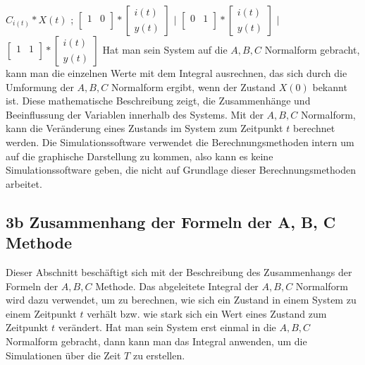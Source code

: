 \documentclass[11pt, a4paper, twoside]{article}   	%
\begin{document}
\newline
\newline
$
C_{i(t)}
*
X(t)
$
;
$
\begin{bmatrix}
	1 & 0\\[0.3em]
\end{bmatrix}
*
\begin{bmatrix}
	i(t)  \\[0.3em]
	y(t)
\end{bmatrix}$
\hspace{1mm}
$|$
\hspace{1mm}
$
\begin{bmatrix}
	0 & 1\\[0.3em]
\end{bmatrix}
*
\begin{bmatrix}
	i(t)  \\[0.3em]
	y(t)
\end{bmatrix} 
$
\hspace{1mm}
$|$
\hspace{1mm}
$
\begin{bmatrix}
	1 & 1\\[0.3em]
\end{bmatrix}
*
\begin{bmatrix}
	i(t)  \\[0.3em]
	y(t)
\end{bmatrix} 
$
\newline
\newline
\newline
Hat man sein System auf die $A, B, C$ Normalform gebracht, kann man die einzelnen Werte mit dem Integral ausrechnen, das sich durch die Umformung der $A, B, C$ Normalform ergibt, wenn der Zustand $X(0)$ bekannt ist.
\newline
\newline
Diese mathematische Beschreibung zeigt, die Zusammenhänge und Beeinflussung der Variablen innerhalb des Systems. Mit der $A, B, C$ Normalform, kann die Veränderung eines Zustands im System zum Zeitpunkt $t$ berechnet werden.
\newline
\newline
Die Simulationssoftware verwendet die Berechnungsmethoden intern um auf die graphische Darstellung zu kommen, also kann es keine Simulationssoftware geben, die nicht auf Grundlage dieser Berechnungsmethoden arbeitet.
\newpage
\subsection{3b Zusammenhang der Formeln der A, B, C Methode}
Dieser Abschnitt beschäftigt sich mit der Beschreibung des Zusammenhangs der Formeln der $A, B, C$ Methode.
\newline
\newline
Das abgeleitete Integral der $A, B, C$ Normalform wird dazu verwendet, um zu berechnen, wie sich ein Zustand in einem System zu einem Zeitpunkt $t$ verhält bzw. wie stark sich ein Wert eines Zustand zum Zeitpunkt $t$ verändert. Hat man sein System erst einmal in die $A, B, C$ Normalform gebracht, dann kann man das Integral anwenden, um die Simulationen über die Zeit $T$ zu erstellen.
\end{document}
